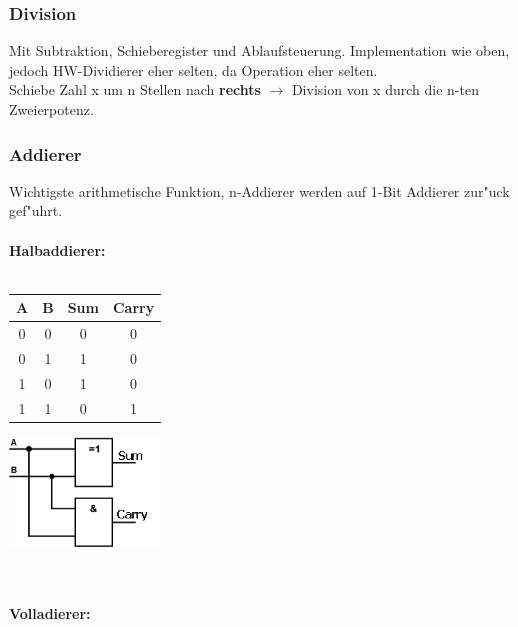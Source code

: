 \subsubsection{Division}
Mit Subtraktion, Schieberegister und Ablaufsteuerung. 
Implementation wie oben, jedoch HW-Dividierer eher selten, da Operation eher selten.\\ Schiebe Zahl x um n Stellen nach \textbf{rechts} $\rightarrow$ Division von x durch die n-ten Zweierpotenz.
\subsubsection{Addierer}
Wichtigste arithmetische Funktion, n-Addierer werden auf 1-Bit Addierer zur"uck gef"uhrt. \\ \\
\textbf{Halbaddierer:}\\ \\
\begin{minipage}{0.5\textwidth}
	\centering
	\begin{tabular}{|c | c | c | c |}
	\hline
	A & B & Sum & Carry\\
	\hline
	0 & 0 & 0 & 0\\
	\hline
	0 & 1 & 1 & 0\\
	\hline
	1 & 0 & 1 & 0\\
	\hline
	1 & 1 & 0 & 1\\
	\hline
	\end{tabular}
\end{minipage}
\begin{minipage}{0.9\textwidth}
	\centering
	\begin{flushleft}
	{\includegraphics[width=0.3\textwidth]{images/Arithmetik/halbaddierer.png}}
	\label{Fig: Halbaddierer}
	\end{flushleft}
\end{minipage}\\ \\

\newpage
\textbf{Volladierer:}\\ \\

